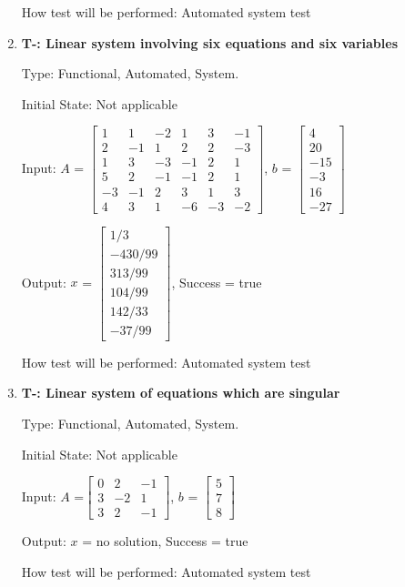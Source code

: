 \documentclass[12pt, titlepage]{article}
\newcounter{tnum}
\begin{document}
\begin{enumerate}
How test will be performed: Automated system test

\item{\textbf{T-\thetnum \label{t-gauss-jordan_six}: Linear
system involving six equations and six variables}}

Type: Functional, Automated, System.
					
Initial State: Not applicable
					
Input: $A$ = $\begin{bmatrix} 
1 & 1 & -2 & 1 & 3 & -1 \\
2 & -1 & 1 & 2 & 2 & -3 \\
1 & 3 & -3 & -1 & 2 &1 \\
5 & 2 &-1 & -1 & 2 & 1 \\
-3 & -1 & 2 & 3 & 1 &3 \\
4 & 3 & 1 & -6 & -3 & -2
\end{bmatrix}$, $b$  = $\begin{bmatrix} 
 4\\
20\\
-15\\
-3\\
16\\
-27 
\end{bmatrix}$
					
Output: $x$ = $\begin{bmatrix} 
1/3\\
-430/99\\
313/99\\
104/99\\
142/33\\
-37/99 
\end{bmatrix}$, Success = true
					
How test will be performed: Automated system test

\item{\textbf{T-\thetnum \label{t-gauss-jordan_three}: Linear system of equations which are singular}}

Type: Functional, Automated, System.
					
Initial State: Not applicable
					
Input: $A$ =$\begin{bmatrix} 
0 & 2 & -1 \\
3 & -2 & 1\\
3 & 2 & -1
\end{bmatrix}$, $b$ = $\begin{bmatrix} 
5\\
7\\
8 
\end{bmatrix}$
					
Output: $x$ = no solution, Success = true
					
How test will be performed: Automated system test

\end{enumerate}
\end{document}
